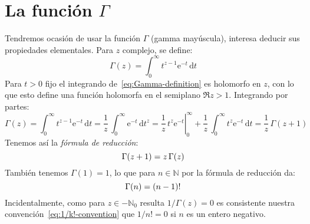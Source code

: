 %

\section[La función \texorpdfstring{$\Gamma$}{gamma}]
	{\protect\boldmath
	    La función $\Gamma$
	 \protect\unboldmath}
\label{sec:gamma-function}

  Tendremos ocasión de usar la función \(\Gamma\)
  (gamma mayúscula),
  interesa deducir sus propiedades elementales.
  Para \(z\) complejo,
  se define:
  \begin{equation}
    \label{eq:Gamma-definition}
    \Gamma(z)
      = \int_0^\infty t^{z - 1} \mathrm{e}^{-t} \, \mathrm{d} t
  \end{equation}
  Para \(t > 0\) fijo el integrando de~\eqref{eq:Gamma-definition}
  es holomorfo en \(z\),
  con lo que esto define una función holomorfa en el semiplano
  \(\Re z > 1\).%
  Integrando por partes:
  \begin{equation*}
    \Gamma(z)
      = \int_0^\infty t^{z - 1} \mathrm{e}^{-t} \, \mathrm{d} t
      = \frac{1}{z}
	  \, \int_0^\infty \mathrm{e}^{-t} \, \mathrm{d} t^z
      = \left. \frac{1}{z} \, t^z \mathrm{e}^{-t} \right|_0^\infty
	  + \frac{1}{z}
	      \, \int_0^\infty t^z \mathrm{e}^{-t} \, \mathrm{d} t
      = \frac{1}{z} \, \Gamma(z + 1)
  \end{equation*}
  Tenemos así la \emph{fórmula de reducción}:
  \begin{equation}
    \label{eq:Gamma-reduction}
    \index{\(\Gamma\)!formula de reduccion@fórmula de reducción}
    \Gamma(z + 1)
      = z \, \Gamma(z)
  \end{equation}
  También tenemos \(\Gamma(1) = 1\),
  lo que para \(n \in \mathbb{N}\) por la fórmula de reducción da:
  \begin{equation}
    \label{eq:Gamma-factorial}
    \index{\(\Gamma\)!factorial}
    \Gamma(n)
      = (n - 1)!
  \end{equation}
  Incidentalmente,
  como para \(z \in - \mathbb{N}_0\)
  resulta \(1 / \Gamma(z) = 0\)
  es consistente nuestra convención~\eqref{eq:1/k!-convention}
  que \(1 / n! = 0\) si \(n\) es un entero negativo.

